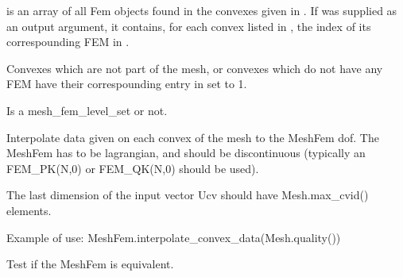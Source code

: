 \documentclass[a4paper,11pt,english]{sphinxmanual}
\begin{document}
\begin{fulllineitems}
\begin{fulllineitems}
 is an array of all Fem objects found in the convexes
given in . If  was supplied as an output argument,
it contains, for each convex listed in , the index of its
correspounding FEM in .

Convexes which are not part of the mesh, or convexes which do not
have any FEM have their correspounding entry in  set to \sphinxhyphen{}1.

\end{fulllineitems}


\begin{fulllineitems}
\label{\detokenize{python/cmdref_MeshFem:getfem.MeshFem.has_linked_mesh_levelset}}
Is a mesh\_fem\_level\_set or not.

\end{fulllineitems}


\begin{fulllineitems}
\label{\detokenize{python/cmdref_MeshFem:getfem.MeshFem.interpolate_convex_data}}
Interpolate data given on each convex of the mesh to the MeshFem dof.
The MeshFem has to be lagrangian, and should be discontinuous (typically
an FEM\_PK(N,0) or FEM\_QK(N,0) should be used).

The last dimension of the input vector Ucv should have
Mesh.max\_cvid() elements.

Example of use: MeshFem.interpolate\_convex\_data(Mesh.quality())

\end{fulllineitems}


\begin{fulllineitems}
\label{\detokenize{python/cmdref_MeshFem:getfem.MeshFem.is_equivalent}}
Test if the MeshFem is equivalent.


\end{fulllineitems}
\end{fulllineitems}
\end{document}
